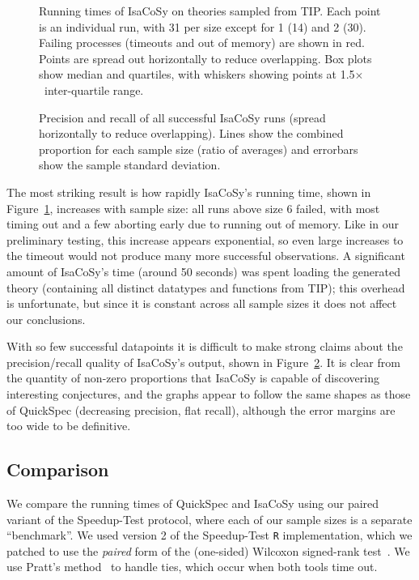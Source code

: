 \begin{figure}
  \centering
  
  \caption{Running times of IsaCoSy on theories sampled from TIP. Each point
    is an individual run, with 31 per size except for 1 (14) and 2 (30). Failing
    processes (timeouts and out of memory) are shown in red. Points are spread
    out horizontally to reduce overlapping. Box plots show median and quartiles,
    with whiskers showing points at 1.5$\times$~inter-quartile range.}
  \label{figure:isacosy_runtimes}
\end{figure}

\begin{figure}
  \centering
  
  \caption{Precision and recall of all successful IsaCoSy runs (spread
    horizontally to reduce overlapping). Lines show the combined proportion for
    each sample size (ratio of averages) and errorbars show the sample standard
    deviation.}
  \label{figure:isacosy_precRec}
\end{figure}

The most striking result is how rapidly IsaCoSy's running time, shown in
Figure~\ref{figure:isacosy_runtimes}, increases with sample size: all runs above
size 6 failed, with most timing out and a few aborting early due to running out
of memory. Like in our preliminary testing, this increase appears exponential,
so even large increases to the timeout would not produce many more successful
observations. A significant amount of IsaCoSy's time (around 50 seconds) was
spent loading the generated theory (containing all distinct datatypes and
functions from TIP); this overhead is unfortunate, but since it is constant
across all sample sizes it does not affect our conclusions.

With so few successful datapoints it is difficult to make strong claims about
the precision/recall quality of IsaCoSy's output, shown in
Figure~\ref{figure:isacosy_precRec}. It is clear from the quantity of non-zero
proportions that IsaCoSy is capable of discovering interesting conjectures, and
the graphs appear to follow the same shapes as those of QuickSpec (decreasing
precision, flat recall), although the error margins are too wide to be
definitive.

\subsection{Comparison}

We compare the running times of QuickSpec and IsaCoSy using our paired variant
of the Speedup-Test protocol, where each of our sample sizes is a separate
``benchmark''. We used version 2 of the Speedup-Test \texttt{R} implementation,
which we patched to use the \emph{paired} form of the (one-sided) Wilcoxon
signed-rank test~\cite{wilcoxon1945individual}. We use Pratt's
method~\cite{pratt1959remarks} to handle ties, which occur when both tools time
out.


